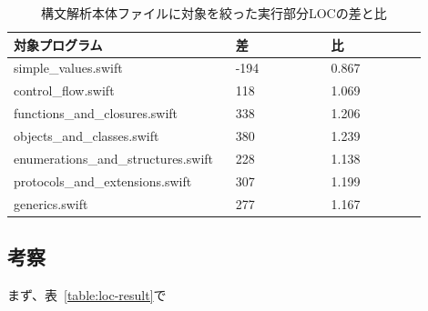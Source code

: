 \begin{table}[!hbtp]
    \begin{center}
        \caption{構文解析本体ファイルに対象を絞った実行部分LOCの差と比}
        \begin{tabular}{|p{0.45\linewidth}|p{0.225\linewidth}|p{0.225\linewidth}|}
            \hline
            対象プログラム & 差 & 比\\
            \hline
            \hline
            simple\_values.swift & -194 & 0.867\\
            \hline
            control\_flow.swift & 118 & 1.069\\
            \hline
            functions\_and\_closures.swift & 338 & 1.206\\
            \hline
            objects\_and\_classes.swift & 380 & 1.239\\
            \hline
            enumerations\_and\_structures.swift & 228 & 1.138\\
            \hline
            protocols\_and\_extensions.swift & 307 & 1.199\\
            \hline
            generics.swift & 277 & 1.167\\
            \hline
        \end{tabular}
        \label{table:parse-loc-arith}
    \end{center}
\end{table}

\subsection{考察}

まず、表~\ref{table:loc-result}で

